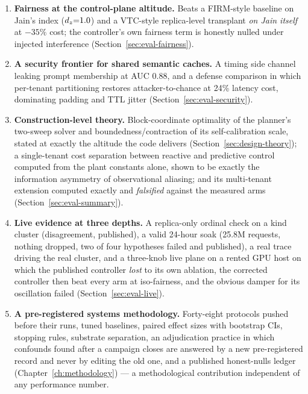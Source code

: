 \begin{enumerate}
        ($+93\%$ over a 10\%-of-working-set fixed cache), dollar-weighted
        savings, an empirical hit-rate--capacity curve, and --- unique among
        surveyed cache papers --- measured hit \emph{precision} with its
        stochasticity ceiling (Section~\ref{sec:eval-cache}).
  \item \textbf{Fairness at the control-plane altitude.} Beats a FIRM-style
        baseline on Jain's index ($d_z{=}1.0$) and a VTC-style replica-level
        transplant \emph{on Jain itself} at $-35\%$ cost; the controller's
        own fairness term is honestly nulled under injected interference
        (Section~\ref{sec:eval-fairness}).
  \item \textbf{A security frontier for shared semantic caches.} A timing
        side channel leaking prompt membership at AUC 0.88, and a defense
        comparison in which per-tenant partitioning restores
        attacker-to-chance at 24\% latency cost, dominating padding and TTL
        jitter (Section~\ref{sec:eval-security}).
  \item \textbf{Construction-level theory.} Block-coordinate optimality of
        the planner's two-sweep solver and boundedness/contraction of its
        self-calibration scale, stated at exactly the altitude the code
        delivers (Section~\ref{sec:design-theory}); a single-tenant cost
        separation between reactive and predictive control computed from
        the plant constants alone, shown to be exactly the information
        asymmetry of observational aliasing; and its multi-tenant extension
        computed exactly and \emph{falsified} against the measured arms
        (Section~\ref{sec:eval-summary}).
  \item \textbf{Live evidence at three depths.} A replica-only ordinal check
        on a kind cluster (disagreement, published), a valid 24-hour soak
        (25.8M requests, nothing dropped, two of four hypotheses failed and
        published), a real trace driving the real cluster, and a three-knob
        live plane on a rented GPU host on which the published controller
        \emph{lost} to its own ablation, the corrected controller then beat
        every arm at iso-fairness, and the obvious damper for its
        oscillation failed (Section~\ref{sec:eval-live}).
  \item \textbf{A pre-registered systems methodology.} Forty-eight
        protocols pushed before their runs, tuned baselines, paired effect
        sizes with bootstrap CIs, stopping rules, substrate separation, an
        adjudication practice in which confounds found after a campaign
        closes are answered by a new pre-registered record and never by
        editing the old one, and a published honest-nulls ledger
        (Chapter~\ref{ch:methodology}) --- a methodological contribution
        independent of any performance number.
\end{enumerate}

